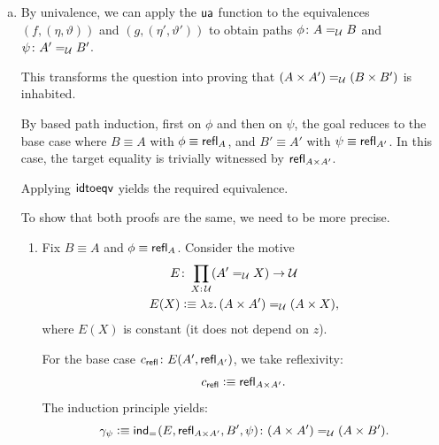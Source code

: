 \begin{solution}
\begin{enumerate}[a),font=\upshape]
        \item By univalence, we can apply the $\mathsf{ua}$ function to the equivalences $(f,(\eta,\vartheta))$ and $(g,(\eta',\vartheta'))$ to obtain paths $\phi\colon A\eq{\univ}B$ and $\psi\colon A'\eq{\univ}B'$.

        This transforms the question into proving that $(A\times A')\mathrel{=_{\mathcal U}}(B\times B')$ is inhabited.
    
        By based path induction, first on $\phi$ and then on $\psi$, the goal reduces to the base case where $B\equiv A$ with $\phi\equiv\mathsf{refl}_A$, and $B'\equiv A'$ with $\psi\equiv\mathsf{refl}_{A'}$. In this case, the target equality is trivially witnessed by $\mathsf{refl}_{A\times A'}$.

        Applying $\mathsf{idtoeqv}$ yields the required equivalence.

        \bigskip
        
        To show that both proofs are the same, we need to be more precise.
        \begin{enumerate}[-]
            \item Fix $B\equiv A$ and $\phi\equiv\mathsf{refl}_A$. Consider the motive
            \begin{align*}
                E&\colon\prod_{X\colon\univ}(A'\eq{\univ}X)\to\univ\\
                E(X)&\defeq\lambda z.\,
                    (A\times A')\eq\univ(A\times X),
            \end{align*}
            where $E(X)$ is constant (it does not depend on $z$).
            
            For the base case $c_{\fun{refl}}\colon E(A',\fun{refl}_{A'})$, we take reflexivity:
            \[
                c_{\mathsf{refl}}\mathrel{\vcentcolon}\equiv\mathsf{refl}_{A\times A'}.
            \]
            The induction principle yields:
            \[
                \gamma_\psi\defeq
                    \fun{ind}_{\eq{}}(E,\fun{refl}_{A\times A'},B',\psi)
                        \colon(A\times A')\eq\univ(A\times B').
            \]
        

\end{enumerate}
\end{enumerate}
\end{solution}

